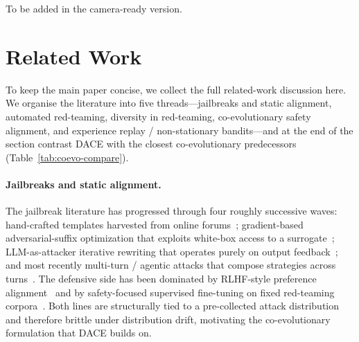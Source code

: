 \documentclass{article}
\newcommand{\method}{\textsc{DACE}\xspace}
\begin{document}
\newpage

\begin{ack}
To be added in the camera-ready version.
\end{ack}






%



\newpage
\appendix

\section{Related Work}
\label{apdx:related-work-full}

To keep the main paper concise, we collect the full related-work discussion here. We organise the literature into five threads---jailbreaks and static alignment, automated red-teaming, diversity in red-teaming, co-evolutionary safety alignment, and experience replay / non-stationary bandits---and at the end of the section contrast \method with the closest co-evolutionary predecessors (Table~\ref{tab:coevo-compare}).

\paragraph{Jailbreaks and static alignment.}
The jailbreak literature has progressed through four roughly successive waves: hand-crafted templates harvested from online forums~\citep{shen2023doanythingnow}; gradient-based adversarial-suffix optimization that exploits white-box access to a surrogate~\citep{zou2023universal}; LLM-as-attacker iterative rewriting that operates purely on output feedback~\citep{chao2023pair, mehrotra2024tap, liu2023autodan, liu2024autodan}; and most recently multi-turn / agentic attacks that compose strategies across turns~\citep{rahman2025xteaming, qi2025majic, samvelyan2024rainbow, liu2024flipattack}. The defensive side has been dominated by RLHF-style preference alignment~\citep{ouyang2022training, bai2022constitutional, dai2023safe} and by safety-focused supervised fine-tuning on fixed red-teaming corpora~\citep{jiang2024wildteaming, mazeika2024harmbench, rottger2023xstest, cui2024orbench, souly2024strongreject, xie2024sorry}. Both lines are structurally tied to a pre-collected attack distribution and therefore brittle under distribution drift, motivating the co-evolutionary formulation that \method builds on.
\end{document}

